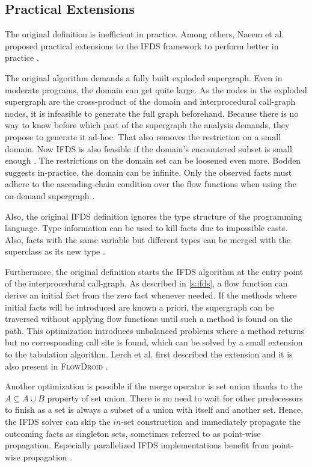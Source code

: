 \documentclass[../draft.tex]{subfiles}
\begin{document}
  
    \subsection{Practical Extensions}\label{s:ifdspractical}
    The original definition is inefficient in practice. 
    Among others, Naeem et al. proposed practical extensions to the IFDS framework to perform better in practice \cite{Naeem2010}.

    The original algorithm demands a fully built exploded supergraph.
    Even in moderate programs, the domain can get quite large. 
    As the nodes in the exploded supergraph are the cross-product of the domain and interprocedural call-graph nodes, it is infeasible to generate the full graph beforehand. 
    Because there is no way to know before which part of the supergraph the analysis demands, they propose to generate it ad-hoc. 
    That also removes the restriction on a small domain. 
    Now IFDS is also feasible if the domain's encountered subset is small enough \cite{Naeem2010}.
    The restrictions on the domain set can be loosened even more. 
    Bodden suggests in-practice, the domain can be infinite. 
    Only the observed facts must adhere to the ascending-chain condition over the flow functions when using the on-demand supergraph \cite{Bodden2012}.
    
    Also, the original IFDS definition ignores the type structure of the programming language. 
    Type information can be used to kill facts due to impossible casts. 
    Also, facts with the same variable but different types can be merged with the superclass as its new type \cite{Naeem2010}.

    Furthermore, the original definition starts the IFDS algorithm at the entry point of the interprocedural call-graph. 
    As described in \autoref{s:ifds}, a flow function can derive an initial fact from the zero fact whenever needed. 
    If the methods where initial facts will be introduced are known a priori, the supergraph can be traversed without applying flow functions until such a method is found on the path. 
    This optimization introduces unbalanced problems where a method returns but no corresponding call site is found, which can be solved by a small extension to the tabulation algorithm. 
    Lerch et al. first described the extension \cite{Lerch2015} and it is also present in \textsc{FlowDroid} \cite{Arzt2017PhD}.

    Another optimization is possible if the merge operator is set union thanks to the $A \subseteq A \cup B$ property of set union. 
    There is no need to wait for other predecessors to finish as a set is always a subset of a union with itself and another set.
    Hence, the IFDS solver can skip the $in$-set construction and immediately propagate the outcoming facts as singleton sets, sometimes referred to as point-wise propagation. 
    Especially parallelized IFDS implementations benefit from point-wise propagation \cite{Rodriguez2011}.
\end{document}
